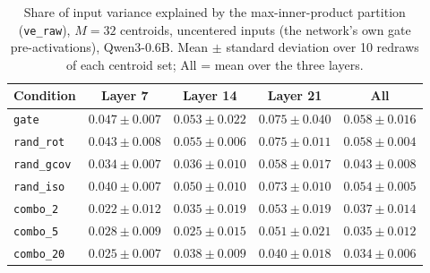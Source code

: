 \begin{table}[t]
\centering
\begin{tabular}{lcccc}
\toprule
Condition & Layer 7 & Layer 14 & Layer 21 & All \\
\midrule
\texttt{gate} & $0.047 \pm 0.007$ & $0.053 \pm 0.022$ & $0.075 \pm 0.040$ & $0.058 \pm 0.016$ \\
\addlinespace
\texttt{rand\_rot} & $0.043 \pm 0.008$ & $0.055 \pm 0.006$ & $0.075 \pm 0.011$ & $0.058 \pm 0.004$ \\
\texttt{rand\_gcov} & $0.034 \pm 0.007$ & $0.036 \pm 0.010$ & $0.058 \pm 0.017$ & $0.043 \pm 0.008$ \\
\texttt{rand\_iso} & $0.040 \pm 0.007$ & $0.050 \pm 0.010$ & $0.073 \pm 0.010$ & $0.054 \pm 0.005$ \\
\addlinespace
\texttt{combo\_2} & $0.022 \pm 0.012$ & $0.035 \pm 0.019$ & $0.053 \pm 0.019$ & $0.037 \pm 0.014$ \\
\texttt{combo\_5} & $0.028 \pm 0.009$ & $0.025 \pm 0.015$ & $0.051 \pm 0.021$ & $0.035 \pm 0.012$ \\
\texttt{combo\_20} & $0.025 \pm 0.007$ & $0.038 \pm 0.009$ & $0.040 \pm 0.018$ & $0.034 \pm 0.006$ \\
\bottomrule
\end{tabular}
\caption{Share of input variance explained by the max-inner-product partition (\texttt{ve\_raw}), $M = 32$ centroids, uncentered inputs (the network's own gate pre-activations), Qwen3-0.6B. Mean $\pm$ standard deviation over 10 redraws of each centroid set; All = mean over the three layers.}
\label{tab:ve-raw-ip-raw-M32}
\end{table}

